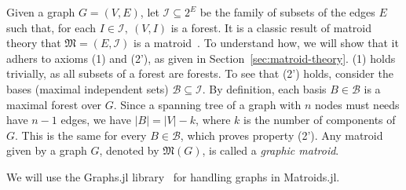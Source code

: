 Given a graph $G=(V,E)$, let $\mathcal{I} \subseteq 2^E$ be the family of subsets of the edges $E$ such that, for each $I \in \mathcal{I},\ (V, I)$ is a forest. It is a classic result of matroid theory that $\mathfrak{M} = (E, \mathcal{I})$ is a matroid~\cite[p.~657]{schrijver-2003}. To understand how, we will show that it adhers to axioms (1) and (2'), as given in Section~\ref{sec:matroid-theory}. (1) holds trivially, as all subsets of a forest are forests. To see that (2') holds, consider the bases (maximal independent sets) $\mathcal{B} \subseteq \mathcal{I}$. By definition, each basis $B \in \mathcal{B}$ is a maximal forest over $G$. Since a spanning tree of a graph with $n$ nodes must needs have $n-1$ edges, we have $|B| = |V| - k$, where $k$ is the number of components of $G$. This is the same for every $B \in \mathcal{B}$, which proves property (2'). Any matroid given by a graph $G$, denoted by $\mathfrak{M}(G)$, is called a \textit{graphic matroid}.

We will use the Graphs.jl library~\cite{Graphs2021} for handling graphs in Matroids.jl. 